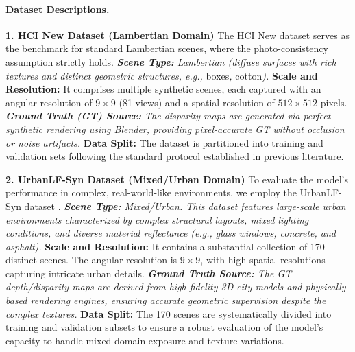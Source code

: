 \documentclass[lettersize,journal]{IEEEtran}
\begin{document}
\paragraph{Dataset Descriptions.}

\textbf{1. HCI New Dataset (Lambertian Domain)}
The HCI New dataset  serves as the benchmark for standard Lambertian scenes, where the photo-consistency assumption strictly holds. 
\textit{   \textbf{Scene Type:} Lambertian (diffuse surfaces with rich textures and distinct geometric structures, e.g., }boxes\textit{, }cotton\textit{).
}   \textbf{Scale and Resolution:} It comprises multiple synthetic scenes, each captured with an angular resolution of $9 \times 9$ (81 views) and a spatial resolution of $512 \times 512$ pixels.
\textit{   \textbf{Ground Truth (GT) Source:} The disparity maps are generated via perfect synthetic rendering using Blender, providing pixel-accurate GT without occlusion or noise artifacts.
}   \textbf{Data Split:} The dataset is partitioned into training and validation sets following the standard protocol established in previous literature.

\textbf{2. UrbanLF-Syn Dataset (Mixed/Urban Domain)}
To evaluate the model's performance in complex, real-world-like environments, we employ the UrbanLF-Syn dataset .
\textit{   \textbf{Scene Type:} Mixed/Urban. This dataset features large-scale urban environments characterized by complex structural layouts, mixed lighting conditions, and diverse material reflectance (e.g., glass windows, concrete, and asphalt).
}   \textbf{Scale and Resolution:} It contains a substantial collection of 170 distinct scenes. The angular resolution is $9 \times 9$, with high spatial resolutions capturing intricate urban details.
\textit{   \textbf{Ground Truth Source:} The GT depth/disparity maps are derived from high-fidelity 3D city models and physically-based rendering engines, ensuring accurate geometric supervision despite the complex textures.
}   \textbf{Data Split:} The 170 scenes are systematically divided into training and validation subsets to ensure a robust evaluation of the model's capacity to handle mixed-domain exposure and texture variations.
\end{document}

